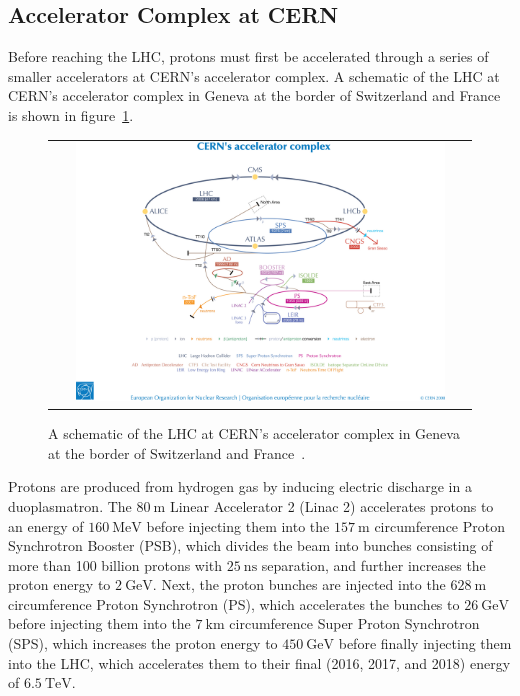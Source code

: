 \subsection{Accelerator Complex at CERN}
Before reaching the LHC, protons must first be accelerated through a series of smaller accelerators at CERN's accelerator complex.
A schematic of the LHC at CERN's accelerator complex in Geneva at the border of Switzerland and France is shown in figure~\ref{CERN_LHC}.
\begin{figure}[!htb]
  \begin{center}
    \begin{tabular}{c}
        \includegraphics[width=0.9\textwidth]{fig_LHC_CMS/CERN_LHC.png}
    \end{tabular}
    \caption{A schematic of the LHC at CERN's accelerator complex in Geneva at the border of Switzerland and France~\cite{Christiane:1260465}.
            }
    \label{CERN_LHC}
  \end{center}
\end{figure}
Protons are produced from hydrogen gas by inducing electric discharge in a duoplasmatron.
The $\SI{80}{\m}$ Linear Accelerator 2 (Linac 2) accelerates protons to an energy of $\SI{160}{\MeV}$ before injecting them into the $\SI{157}{\m}$ circumference Proton Synchrotron Booster (PSB), which divides the beam into bunches consisting of more than 100 billion protons with $\SI{25}{\ns}$ separation, and further increases the proton energy to $\SI{2}{\GeV}$.
Next, the proton bunches are injected into the $\SI{628}{\m}$ circumference Proton Synchrotron (PS), which accelerates the bunches to $\SI{26}{\GeV}$ before injecting them into the $\SI{7}{\km}$ circumference Super Proton Synchrotron (SPS), which increases the proton energy to $\SI{450}{\GeV}$ before finally injecting them into the LHC, which accelerates them to their final (2016, 2017, and 2018) energy of $\SI{6.5}{\TeV}$.

